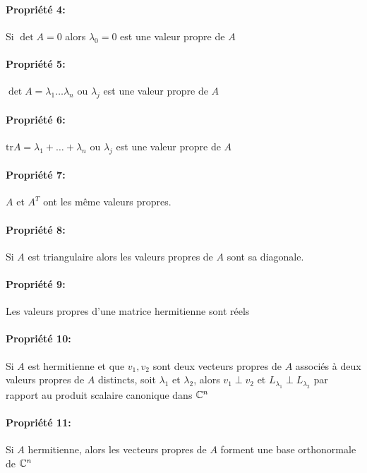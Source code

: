 \paragraph{Propriété 4:} Si $\det A = 0$ alors $\lambda_0 = 0$ est une valeur propre de $A$
\paragraph{Propriété 5:} $\det A = \lambda_1 \dots \lambda_n$ ou $\lambda_j$ est une valeur propre de $A$
\paragraph{Propriété 6:} $\text{tr} A = \lambda_1 + \dots + \lambda_n$ ou $\lambda_j$ est une valeur propre de $A$
\paragraph{Propriété 7:} $A$ et $A^T$ ont les même valeurs propres.
\paragraph{Propriété 8:} Si $A$ est triangulaire alors les valeurs propres de $A$ sont sa diagonale.
\paragraph{Propriété 9:} Les valeurs propres d'une matrice hermitienne sont réels
\paragraph{Propriété 10:} Si $A$ est hermitienne et que $v_1, v_2$ sont deux vecteurs propres de
$A$ associés à deux valeurs propres de $A$ distincts, soit $\lambda_1$ et $\lambda_2$, alors $v_1 \perp v_2$
et $L_{\lambda_1} \perp L_{\lambda_2}$ par rapport au produit scalaire canonique dans $\mathbb{C}^n$
\paragraph{Propriété 11:} \label{property_11} Si $A$ hermitienne, alors les vecteurs propres de $A$ forment une base orthonormale de $\mathbb{C}^n$

